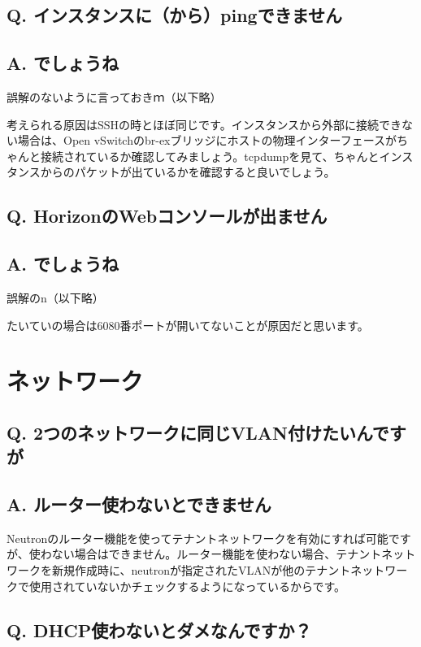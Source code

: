 \documentclass[9pt,b5paper,tombo,openany]{jsbook}
\begin{document}
\subsection*{{\LARGE\bfseries Q.} インスタンスに（から）pingできません}
\subsection*{{\LARGE\bfseries A.} でしょうね}
誤解のないように言っておきｍ（以下略）

考えられる原因はSSHの時とほぼ同じです。インスタンスから外部に接続できない場合は、Open vSwitchのbr-exブリッジにホストの物理インターフェースがちゃんと接続されているか確認してみましょう。tcpdumpを見て、ちゃんとインスタンスからのパケットが出ているかを確認すると良いでしょう。

\subsection*{{\LARGE\bfseries Q.} HorizonのWebコンソールが出ません}
\subsection*{{\LARGE\bfseries A.} でしょうね}
誤解のn（以下略）

たいていの場合は6080番ポートが開いてないことが原因だと思います。

\section{ネットワーク}

\subsection*{{\LARGE\bfseries Q.} 2つのネットワークに同じVLAN付けたいんですが}
\subsection*{{\LARGE\bfseries A.} ルーター使わないとできません}
Neutronのルーター機能を使ってテナントネットワークを有効にすれば可能ですが、使わない場合はできません。ルーター機能を使わない場合、テナントネットワークを新規作成時に、neutronが指定されたVLANが他のテナントネットワークで使用されていないかチェックするようになっているからです。

\subsection*{{\LARGE\bfseries Q.} DHCP使わないとダメなんですか？}
\end{document}
